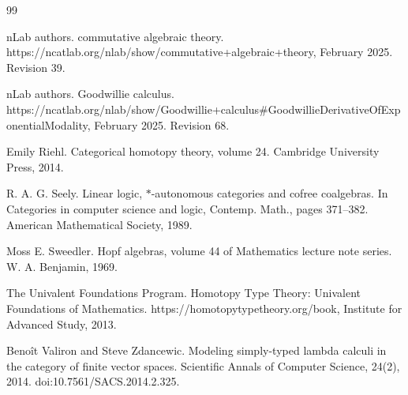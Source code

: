 \begin{thebibliography}{99}
\par\noindent    nLab authors.  commutative algebraic theory.  https://ncatlab.org/nlab/show/commutative+algebraic+theory, February 2025.  Revision 39.  

\par\noindent    nLab authors.  Goodwillie calculus.  https://ncatlab.org/nlab/show/Goodwillie+calculus\#GoodwillieDerivativeOfExponentialModality, February 2025.  Revision 68.  

\par\noindent    Emily Riehl.  Categorical homotopy theory, volume 24.  Cambridge University Press, 2014.  

\par\noindent    R. A. G. Seely.  Linear logic, $\ast$-autonomous categories and cofree coalgebras.  In Categories in computer science and logic, Contemp. Math., pages 371–382. American Mathematical Society, 1989.  

\par\noindent    Moss E. Sweedler.  Hopf algebras, volume 44 of Mathematics lecture note series.  W. A. Benjamin, 1969.  

\par\noindent    The Univalent Foundations Program.  Homotopy Type Theory: Univalent Foundations of Mathematics.  https://homotopytypetheory.org/book, Institute for Advanced Study, 2013.  

\par\noindent    Benoît Valiron and Steve Zdancewic.  Modeling simply-typed lambda calculi in the category of finite vector spaces.  Scientific Annals of Computer Science, 24(2), 2014.  doi:10.7561/SACS.2014.2.325.  

\end{thebibliography}
